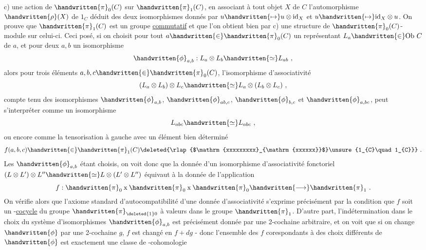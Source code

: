 c) une action de $\handwritten{\pi}_{0}(C)$ sur $\handwritten{\pi}_{1}(C)$, en associant à tout objet $X$ de $C$ l'automorphisme  $\handwritten{\rho}(X)$ de $1_C$ déduit des deux isomorphismes
donnés par $u\handwritten{\mapsto}u\otimes\mathrm{id}_{X}$ et $u\handwritten{\mapsto}\mathrm{id}_{X}\otimes u$. On prouve que $\handwritten{\pi}_{1}(C)$ est un groupe \uline{commutatif} et que l'on obtient bien par c) une structure de $\handwritten{\pi}_{0}(C)$-module sur celui-ci. Ceci posé, si on choisit pour tout $a\handwritten{\in}\handwritten{\pi}_{0}(C)$ un représentant $L_{a}\handwritten{\in}\mathrm{Ob}\ C$ de $a$, et pour deux  $a,b$ un isomorphisme
\[
\handwritten{\phi}_{a,b}: L_a\otimes L_b\handwritten{\simeq}L_{ab}\ , 
\]
alors pour trois éléments $a,b,c\handwritten{\in}\handwritten{\pi}_{0}(C)$, l'isomorphisme d'associativité
\[
(L_a\otimes L_b)\otimes L_c\handwritten{\simeq}L_a\otimes(L_b\otimes L_c)\ ,
\]
compte tenu des isomorphismes $\handwritten{\phi}_{a,b}$, $\handwritten{\phi}_{ab,c}$, $\handwritten{\phi}_{b,c}$ et $\handwritten{\phi}_{a,bc}$, peut s'interpréter comme un isomorphisme
\[
L_{abc}\handwritten{\simeq}L_{abc}\ ,
\]
ou encore comme la tensorisation à gauche avec un élément bien déterminé
\[
f(a,b,c)\handwritten{\in}\handwritten{\pi}_{1}(C)\deleted{\rlap{$\mathrm{xxxxxxxxx}_{\mathrm{xxxxxx}}$}\unsure{1_{C}\quad 1_{C}}}\ .
\]
Les $\handwritten{\phi}_{a,b}$ étant choisis, on voit donc que la donnée d'un isomorphisme d'associativité fonctoriel $(L\otimes L')\otimes L''\handwritten{\simeq}L\otimes(L'\otimes L'')$ équivaut à la donnée de l'application
\[
f:\handwritten{\pi}_{0}\mathbin{\mathrm{x}}\handwritten{\pi}_{0}\mathbin{\mathrm{x}}\handwritten{\pi}_{0}\handwritten{\longrightarrow}\handwritten{\pi}_{1}\ .
\]
On vérifie alors que l'axiome  standard d'autocompatibilité d'une donnée d'associativité  s'exprime précisément par la condition que $f$ soit un -\uline{cocycle} du groupe $\handwritten{\pi}_{\deleted{1}0}$ à valeurs dans le groupe $\handwritten{\pi}_{1}$. D'autre part, l'indétermination dans le choix du système d'isomorphismes $\handwritten{\phi}_{a,b}$ est précisément donnée par une 2-cochaine arbitraire, et on voit que si on change $\handwritten{\phi}$ par une 2-cochaine $g$, $f$ est changé en $f+dg$ - donc l'ensemble des $f$ corespondants à des choix différents de $\handwritten{\phi}$ est exactement une classe de -cohomologie
